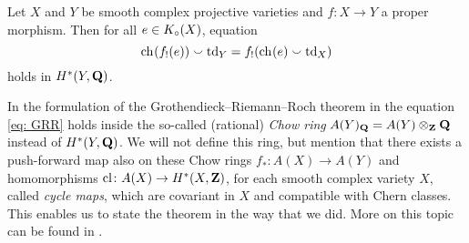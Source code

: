 
\begin{theorem}
    \label{Grothendieck-Riemann-Roch}
    Let $X$ and $Y$ be smooth complex projective varieties and ${f \colon X \to Y}$ a proper morphism. Then for all $e \in K_{\circ}(X)$, equation 
    \begin{equation}
        \label{eq: GRR}
        \ch[]{f_!(e)} \smallsmile \tdclass{Y} = f_!(\ch[]{e} \smallsmile \tdclass{X})
    \end{equation}
    holds in $H^{*}(Y, \mathbf Q)$.
\end{theorem}


\begin{remark}
    In the formulation of the Grothendieck--Riemann--Roch theorem in \cite[\S 15, Theorem 15.2]{Fulton1998} the equation \eqref{eq: GRR} holds inside the so-called (rational) \emph{Chow ring} $A(Y)_\mathbf Q = A(Y) \otimes_{\mathbf Z} \mathbf Q$ instead of $H^{*}(Y, \mathbf Q)$. We will not define this ring, but mention that there exists a push-forward map also on these Chow rings $f_* \colon A(X) \to A(Y)$ and homomorphisms $\operatorname{cl} \colon A(X) \to H^{*}(X, \mathbf Z)$, for each smooth complex variety $X$, called \emph{cycle maps}, which are covariant in $X$ and compatible with Chern classes. This enables us to state the theorem in the way that we did. More on this topic can be found in \cite[\S 19]{Fulton1998}.
\end{remark}


